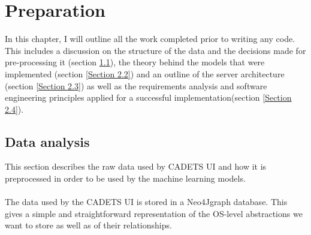 
	\chapter{Preparation} 
	In this chapter, I will outline all the work completed prior to writing any code. This includes a discussion on the structure of the data and the decisions made for pre-processing it (section \ref{Section 2.1}), the theory behind the models that were implemented (section \ref{Section 2.2}) and an outline of the server architecture (section \ref{Section 2.3}) as well as the requirements analysis and software engineering principles applied for a successful implementation(section \ref{Section 2.4}).
	
	\section{Data analysis} \label{Section 2.1}
	This section describes the raw data used by CADETS UI and how it is preprocessed in order to be used by the machine learning models.
	\\ \\
	The data used by the CADETS UI is stored in a Neo4J\footnotemark[1] graph database. This gives a simple and straightforward representation of the OS-level abstractions we want to store as well as of their relationships.

	
